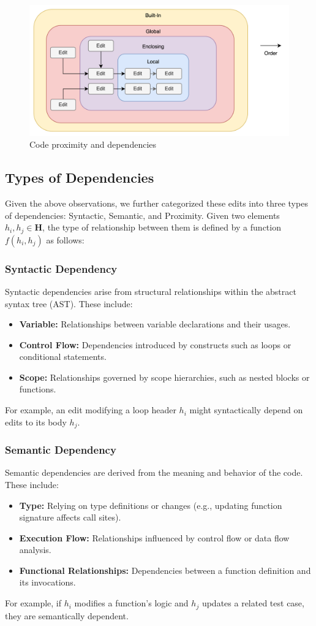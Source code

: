 \begin{figure}
    \centering
    \includegraphics[width=0.6\linewidth]{fig/code_proximity.png}
    \caption{Code proximity and dependencies}
    \label{fig:proximity}
\end{figure}

\subsection{Types of Dependencies}

Given the above observations, we further categorized these edits into three types of dependencies: Syntactic, Semantic, and Proximity. Given two elements \( h_i, h_j \in \mathbf{H} \), the type of relationship between them is defined by a function \( f(h_i, h_j) \) as follows:

\subsubsection{Syntactic Dependency}
Syntactic dependencies arise from structural relationships within the abstract syntax tree (AST). These include:
\begin{itemize}
    \item \textbf{Variable:} Relationships between variable declarations and their usages.
    \item \textbf{Control Flow:} Dependencies introduced by constructs such as loops or conditional statements.
    \item \textbf{Scope:} Relationships governed by scope hierarchies, such as nested blocks or functions.
\end{itemize}
For example, an edit modifying a loop header \( h_i \) might syntactically depend on edits to its body \( h_j \).

\subsubsection{Semantic Dependency}
Semantic dependencies are derived from the meaning and behavior of the code. These include:
\begin{itemize}
    \item \textbf{Type:} Relying on type definitions or changes (e.g., updating function signature affects call sites).
    \item \textbf{Execution Flow:} Relationships influenced by control flow or data flow analysis.
    \item \textbf{Functional Relationships:} Dependencies between a function definition and its invocations.
\end{itemize}
For example, if \( h_i \) modifies a function’s logic and \( h_j \) updates a related test case, they are semantically dependent.

